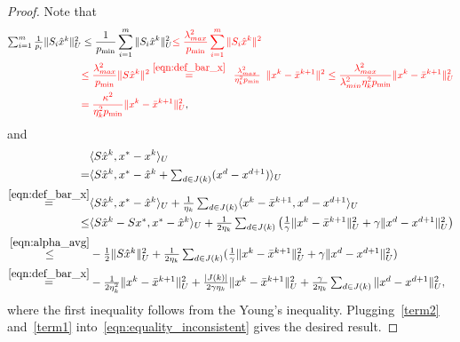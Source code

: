 {\begin{proof}
Note that
\begin{equation}\label{term2}
\begin{aligned}
\textstyle\sum_{i=1}^m\frac{1}{p_i} \|S_i\hat{x}^{k}\|_U^2&\le\frac{1}{p_{\min}}
\sum_{i=1}^m\|S_i\hat{x}^{k}\|_U^2{\color{red}{\leq
\frac{\lambda_{max}^2}{p_{\min}} \sum_{i=1}^m\|S_i\hat{x}^{k}\|^2}}\\
&{\color{red}{\leq\frac{\lambda_{max}^2}{p_{\min}}
\|S\hat{x}^{k}\|^2\overset{\eqref{eqn:def_bar_x}}{=}
\begin{array}{l}\frac{\lambda_{max}^2}{\eta_k^2p_{\min}}\end{array}\|x^k-\bar{x}^{k+1}\|^2
\leq\frac{\lambda_{max}^2}{\lambda_{min}^2\eta_k^2p_{\min}}\|x^k-\bar{x}^{k+1}\|_U^2}}\\
&{\color{red}{=\frac{\kappa^2}{\eta_k^2p_{\min}}\|x^k-\bar{x}^{k+1}\|_U^2}},
\end{aligned}
\end{equation}
and
\begin{equation}\label{term1}
\begin{aligned}
&\langle S \hat{x}^{k}, x^* - x^k \rangle_U\\
=&\textstyle\langle S \hat{x}^{k},x^* - \hat{x}^k + \sum_{d\in J(k)} (x^{d} -
x^{d+1})\rangle_U\cr \overset{\eqref{eqn:def_bar_x}}=&\textstyle\langle S
\hat{x}^{k}, x^* - \hat{x}^k\rangle_U + \frac{1}{\eta_k}\sum_{d\in J(k)}\langle
x^k-\bar{x}^{k+1}, x^{d} - x^{d+1}\rangle_U\cr \le&\textstyle \langle S
\hat{x}^{k}-Sx^*, x^* - \hat{x}^k\rangle_U+\frac{1}{2\eta_k}\sum_{d\in
J(k)}\big(\frac{1}{\gamma}\|x^k-\bar{x}^{k+1}\|_U^2+ \gamma\|x^{d} -
x^{d+1}\|_U^2\big)\cr \overset{\eqref{eqn:alpha_avg}}\le&\textstyle
-\frac{1}{2}\|S \hat{x}^{k}\|_U^2+\frac{1}{2\eta_k}\sum_{d\in
J(k)}(\frac{1}{\gamma}\|x^k-\bar{x}^{k+1}\|_U^2+ \gamma\|x^{d} -
x^{d+1}\|_U^2)\cr
\overset{\eqref{eqn:def_bar_x}}=&\textstyle-\frac{1}{2\eta_k^2}\|x^k-\bar{x}^{k+1}\|_U^2+
\frac{|J(k)|}{2\gamma\eta_k}\|x^k-\bar{x}^{k+1}\|_U^2+\frac{\gamma}{2\eta_k}\sum_{d\in
J(k)}\|x^{d} - x^{d+1}\|_U^2,
\end{aligned}
\end{equation}
where the first inequality follows from the Young's inequality. Plugging~\eqref{term2} and~\eqref{term1} into~\eqref{eqn:equality_inconsistent} gives the desired result.\hfill\end{proof}

}
